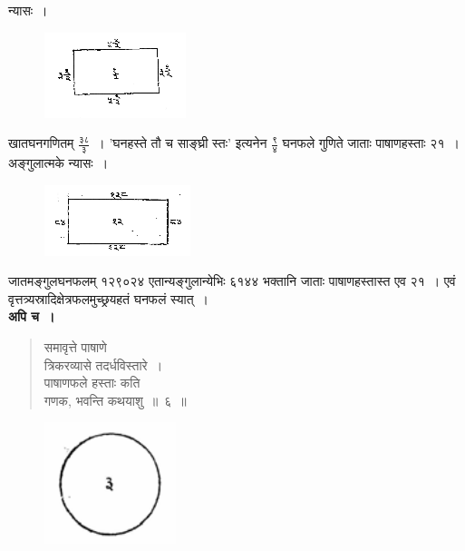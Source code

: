 \documentclass[11pt, openany]{book}
\begin{document}
न्यासः~। 
\vspace{-2mm}

\begin{figure}[h!]
    \centering
    \includegraphics[scale=0.85]{graphics/capture190.png}
\end{figure}
\vspace{-4mm}

खातघनगणितम् $\frac{\mbox{३८}}{\mbox{३}}$~। 'घनहस्ते तौ च साङ्घ्री स्तः' इत्यनेन $\frac{\mbox{९}}{\mbox{४}}$
घनफले गुणिते जाताः पाषाणहस्ताः २१~। \\

\vspace{-3mm}
अङ्गुलात्मके न्यासः~। 
\vspace{-2mm}

\begin{figure}[h!]
    \centering
    \includegraphics[scale=0.85]{graphics/capture191.png}
\end{figure}
\newpage
जातमङ्गुलघनफलम् १२९०२४ एतान्यङ्गुलान्येभिः ६१४४ भक्तानि जाताः पाषाणहस्तास्त एव २१~। एवं वृत्तत्र्यस्रादिक्षेत्रफलमुच्छ्रयहतं घनफलं स्यात्~। \\

\textbf{अपि च~।} 
\begin{quote}
    \bqt 
    समावृत्ते पाषाणे\\
त्रिकरव्यासे तदर्धविस्तारे~। \\
पाषाणफले हस्ताः कति\\
गणक, भवन्ति कथयाशु~॥~६~॥~
\end{quote}
\vspace{-2mm}

\begin{figure}[h!]
    \centering
    \includegraphics[scale=0.5]{graphics/capture192.png}
\end{figure}
\vspace{-2mm}
\end{document}
